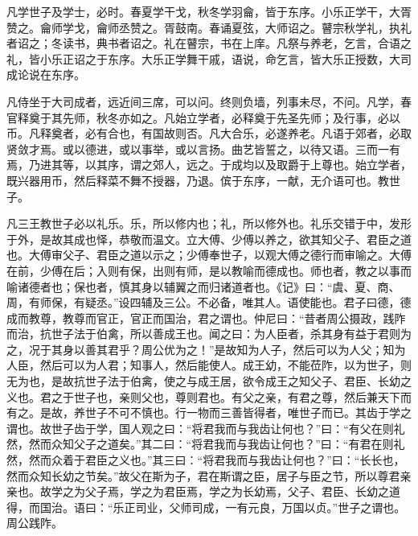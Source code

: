 \documentclass[]{article}
\begin{document}
凡学世子及学士，必时。春夏学干戈，秋冬学羽龠，皆于东序。小乐正学干，大胥赞之。龠师学戈，龠师丞赞之。胥鼓南。春诵夏弦，大师诏之。瞽宗秋学礼，执礼者诏之；冬读书，典书者诏之。礼在瞽宗，书在上庠。凡祭与养老，乞言，合语之礼，皆小乐正诏之于东序。大乐正学舞干戚，语说，命乞言，皆大乐正授数，大司成论说在东序。

凡侍坐于大司成者，远近间三席，可以问。终则负墙，列事未尽，不问。凡学，春官释奠于其先师，秋冬亦如之。凡始立学者，必释奠于先圣先师；及行事，必以币。凡释奠者，必有合也，有国故则否。凡大合乐，必遂养老。凡语于郊者，必取贤敛才焉。或以德进，或以事举，或以言扬。曲艺皆誓之，以待又语。三而一有焉，乃进其等，以其序，谓之郊人，远之。于成均以及取爵于上尊也。始立学者，既兴器用币，然后释菜不舞不授器，乃退。傧于东序，一献，无介语可也。教世子。

凡三王教世子必以礼乐。乐，所以修内也；礼，所以修外也。礼乐交错于中，发形于外，是故其成也怿，恭敬而温文。立大傅、少傅以养之，欲其知父子、君臣之道也。大傅审父子、君臣之道以示之；少傅奉世子，以观大傅之德行而审喻之。大傅在前，少傅在后；入则有保，出则有师，是以教喻而德成也。师也者，教之以事而喻诸德者也；保也者，慎其身以辅翼之而归诸道者也。《记》曰：``虞、夏、商、周，有师保，有疑丞。''设四辅及三公。不必备，唯其人。语使能也。君子曰德，德成而教尊，教尊而官正，官正而国治，君之谓也。仲尼曰：``昔者周公摄政，践阼而治，抗世子法于伯禽，所以善成王也。闻之曰：为人臣者，杀其身有益于君则为之，况于其身以善其君乎？周公优为之！''是故知为人子，然后可以为人父；知为人臣，然后可以为人君；知事人，然后能使人。成王幼，不能莅阼，以为世子，则无为也，是故抗世子法于伯禽，使之与成王居，欲令成王之知父子、君臣、长幼之义也。君之于世子也，亲则父也，尊则君也。有父之亲，有君之尊，然后兼天下而有之。是故，养世子不可不慎也。行一物而三善皆得者，唯世子而已。其齿于学之谓也。故世子齿于学，国人观之曰：``将君我而与我齿让何也？''曰：``有父在则礼然，然而众知父子之道矣。''其二曰：``将君我而与我齿让何也？''曰：``有君在则礼然，然而众着于君臣之义也。''其三曰：``将君我而与我齿让何也？''曰：``长长也，然而众知长幼之节矣。''故父在斯为子，君在斯谓之臣，居子与臣之节，所以尊君亲亲也。故学之为父子焉，学之为君臣焉，学之为长幼焉，父子、君臣、长幼之道得，而国治。语曰：``乐正司业，父师司成，一有元良，万国以贞。''世子之谓也。周公践阼。
\end{document}
